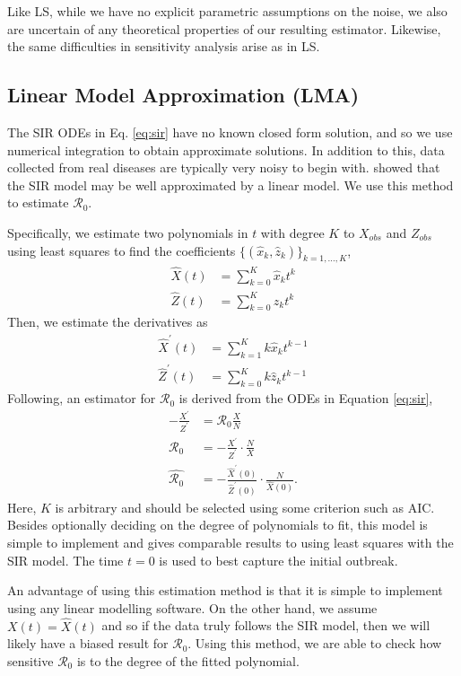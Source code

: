 \documentclass[12pt]{article}
\newcommand{\rr}{\ensuremath{\mathcal{R}_0}}
\begin{document}
Like LS, while we have no explicit parametric assumptions on the noise, we also are uncertain of any theoretical properties of our resulting estimator.  Likewise, the same difficulties in sensitivity analysis arise as in LS.



\subsection{Linear Model Approximation (LMA)}\label{linear-model-approximation-degree-10}

The SIR ODEs in Eq. \ref{eq:sir} have no known closed form solution, and so we use numerical integration to obtain approximate solutions.  In addition to this, data collected from real diseases are typically very noisy to begin with.  \cite{chang2017} showed that the SIR model may be well approximated by a linear model.  We use this method to estimate $\rr$.

Specifically, we estimate two polynomials in \(t\) with degree $K$  to \(X_{obs}\)
and \(Z_{obs}\) using least squares to find the coefficients $\{(\hat{x}_k,
\hat{z}_k)\}_{k=1, \dots, K}$,
\begin{align*}
\hat{X}(t) &= \sum_{k=0}^K \hat{x}_k t^k\\
{\hat{Z}}(t) &= \sum_{k=0}^K \hat{z}_k t^k
\end{align*}
Then, we estimate the derivatives as
\begin{align*}
\hat{X}^\prime(t) &= \sum_{k=1}^K k \hat{x}_k t^{k-1}\\
\hat{Z}^\prime(t) &= \sum_{k=0}^K k \hat{z}_k t^{k-1}
\end{align*}
Following,  an estimator for \(\rr\) is derived from the ODEs in Equation \eqref{eq:sir},
\begin{align}
  - \frac{X^\prime}{Z^\prime}&= \rr \frac{X}{N} \nonumber\\
  \rr &=       -\frac{X^\prime}{
        Z^\prime} \cdot \frac{N}{X} \nonumber\\
  \hat{\rr} &= -\frac{\hat{X}^\prime(0)}{ \hat{Z}^\prime(0)} \cdot \frac{N}{\hat{X}(0)}. \nonumber
  \end{align}
  Here, $K$ is arbitrary and should be selected using some criterion such as AIC.  Besides optionally deciding on the degree of polynomials to fit, this model is simple to implement and gives comparable results to using least squares with the SIR model.  The time $t=0$ is used to best capture the initial outbreak.

  An advantage of using this estimation method is that it is simple to implement using any linear modelling software.  On the other hand, we assume $X(t) = \hat{X}(t)$ and so if the data truly follows the SIR model, then we will likely have a biased result for $\rr$.  Using this method, we are able to check how sensitive $\rr$ is to the degree of the fitted polynomial.
\end{document}

